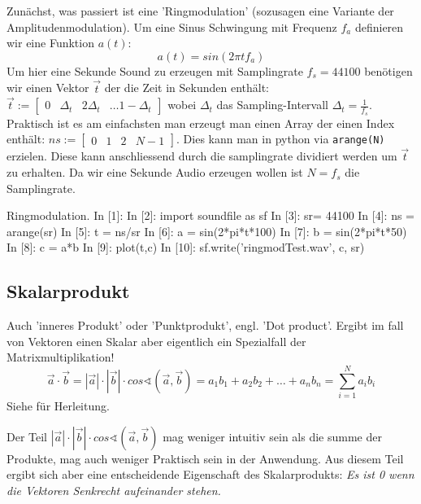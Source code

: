 \begin{answer}
Zunächst, was passiert ist eine 'Ringmodulation' (sozusagen eine Variante der Amplitudenmodulation). Um eine Sinus Schwingung mit Frequenz $f_a$ definieren wir eine Funktion $a(t)$:
\begin{equation}
a(t) = sin(2 \pi t f_a)
\end{equation}
Um hier eine Sekunde Sound zu erzeugen mit Samplingrate $f_s = 44100$ benötigen wir einen Vektor $\vec{t}$ der die Zeit in Sekunden enthält: $\vec{t}:= \begin{bmatrix} 0 & \Delta_t& 2 \Delta_t &  \dots 1-\Delta_t \end{bmatrix}$ wobei $\Delta_t$ das Sampling-Intervall $\Delta_t = \frac{1}{f_s}$. Praktisch ist es am einfachsten man erzeugt man einen Array der einen Index enthält: $ns := \begin{bmatrix} 0 & 1 & 2 &  N-1 \end{bmatrix}$. Dies kann man in python via \texttt{arange(N)} erzielen. Diese kann anschliessend durch die samplingrate dividiert werden um $\vec{t}$ zu erhalten. Da wir eine Sekunde Audio erzeugen wollen ist $N=f_s$ die Samplingrate.


\begin{python}{Ringmodulation.}
In [1]: %
In [2]: import soundfile as sf
In [3]: sr= 44100
In [4]: ns = arange(sr)
In [5]: t = ns/sr
In [6]: a = sin(2*pi*t*100)
In [7]: b = sin(2*pi*t*50)
In [8]: c = a*b
In [9]: plot(t,c)
In [10]: sf.write('ringmodTest.wav', c, sr)
\end{python}
\end{answer}


\subsection*{Skalarprodukt}

Auch 'inneres Produkt' oder 'Punktprodukt', engl. 'Dot product'. Ergibt im fall von Vektoren einen Skalar aber eigentlich ein Spezialfall der Matrixmultiplikation!
$$\vec{a}\cdot \vec{b} = |\vec{a}|\cdot |\vec{b}|\cdot cos \sphericalangle ({\vec {a}},{\vec {b}}) = a_1 b_1 + a_2 b_2 + \dots +a_n b_n = \sum_{i=1}^N a_ib_i$$
Siehe \citep[p.~45]{Westermmann2008}  für Herleitung.

Der Teil $|\vec{a}|\cdot |\vec{b}|\cdot cos \sphericalangle ({\vec {a}},{\vec {b}})$ mag weniger intuitiv sein als die summe der Produkte, mag auch weniger Praktisch sein in der Anwendung. Aus diesem Teil ergibt sich aber eine entscheidende Eigenschaft des Skalarprodukts: \emph{Es ist 0 wenn die Vektoren Senkrecht aufeinander stehen.}

